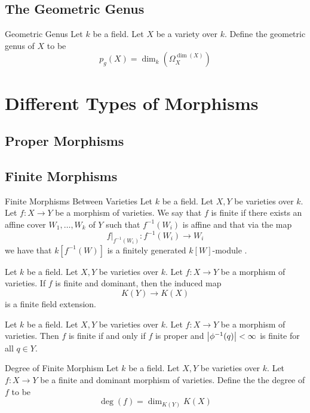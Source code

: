 \documentclass[a4paper]{article}
\begin{document}
\subsection{The Geometric Genus}
\begin{defn}{Geometric Genus}{} Let $k$ be a field. Let $X$ be a variety over $k$. Define the geometric genus of $X$ to be $$p_g(X)=\dim_k\left(\Omega_X^{\dim(X)}\right)$$
\end{defn}

\pagebreak
\section{Different Types of Morphisms}
\subsection{Proper Morphisms}

\subsection{Finite Morphisms}
\begin{defn}{Finite Morphisms Between Varieties}{} Let $k$ be a field. Let $X,Y$ be varieties over $k$. Let $f:X\to Y$ be a morphism of varieties. We say that $f$ is finite if there exists an affine cover $W_1,\dots,W_k$ of $Y$ such that $f^{-1}(W_i)$ is affine and that via the map $$f|_{f^{-1}(W_i)}:f^{-1}(W_i)\to W_i$$ we have that $k[f^{-1}(W)]$ is a finitely generated $k[W]$-module . 
\end{defn}

\begin{prp}{}{} Let $k$ be a field. Let $X,Y$ be varieties over $k$. Let $f:X\to Y$ be a morphism of varieties. If $f$ is finite and dominant, then the induced map $$K(Y)\to K(X)$$ is a finite field extension. 
\end{prp}

\begin{prp}{}{} Let $k$ be a field. Let $X,Y$ be varieties over $k$. Let $f:X\to Y$ be a morphism of varieties. Then $f$ is finite if and only if $f$ is proper and $\abs{\phi^{-1}(q)}<\infty$ is finite for all $q\in Y$. 
\end{prp}

\begin{defn}{Degree of Finite Morphism}{} Let $k$ be a field. Let $X,Y$ be varieties over $k$. Let $f:X\to Y$ be a finite and dominant morphism of varieties. Define the the degree of $f$ to be $$\deg(f)=\dim_{K(Y)}K(X)$$
\end{defn}
\end{document}

